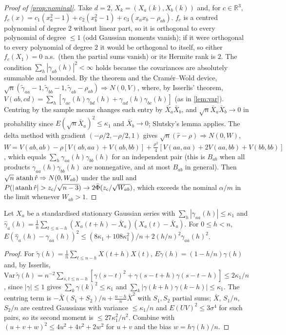 \begin{proof}[Proof of \cref{prop:nominal}]
Take $d=2$, $X_k=(X_a(k),X_b(k))$ and, for $c\in\mathbb R^3$,
$f_c(x)=c_1(x_a^2-1)+c_2(x_b^2-1)+c_3(x_ax_b-\rho_{ab})$. $f_c$ is a centred
polynomial of degree $2$ without linear part, so it is orthogonal to every
polynomial of degree $\le1$ (odd Gaussian moments vanish); if it were orthogonal
to every polynomial of degree $2$ it would be orthogonal to itself, so either
$f_c(X_1)=0$ a.s.\ (then the partial sums vanish) or its Hermite rank is $2$.
The condition $\sum_h|\gamma_{ab}(h)|^2<\infty$ holds because the covariances are
absolutely summable and bounded. By the theorem and the Cram\'er--Wold device,
$\sqrt n(\tilde\gamma_{aa}-1,\tilde\gamma_{bb}-1,\tilde\gamma_{ab}-\rho_{ab})\Rightarrow N(0,V)$,
where, by Isserlis' theorem, $V(ab,cd)=\sum_h[\gamma_{ac}(h)\gamma_{bd}(h)+\gamma_{ad}(h)\gamma_{bc}(h)]$
(as in \cref{lem:var}). Centring by the sample means changes each entry by
$\bar X_a\bar X_b$, and $\sqrt n\bar X_a\bar X_b\to0$ in probability since
$E(\sqrt n\bar X_a)^2\le\kappa_1$ and $\bar X_b\to0$; Slutsky's lemma applies.
The delta method with gradient $(-\rho/2,-\rho/2,1)$ gives $\sqrt n(\hat r-\rho)
\Rightarrow N(0,W)$,
$W=V(ab,ab)-\rho[V(ab,aa)+V(ab,bb)]+\frac{\rho^2}{4}[V(aa,aa)+2V(aa,bb)+V(bb,bb)]$,
which equals $\sum_h\gamma_{aa}(h)\gamma_{bb}(h)$ for an independent pair (this is
$B_{ab}$ when all products $\gamma_{aa}(h)\gamma_{bb}(h)$ are nonnegative, and at most
$B_{ab}$ in general). Then $\sqrt{n}\,\operatorname{atanh}\hat r\Rightarrow N(0,W_{ab})$ under the
null and $P(|\atanh\hat r|>z_c/\sqrt{n-3})\to2\bar\Phi(z_c/\sqrt{W_{ab}})$, which
exceeds the nominal $\alpha/m$ in the limit whenever $W_{ab}>1$.
\end{proof}

\begin{lemma}\label{lem:acvl2}
Let $X_a$ be a standardised stationary Gaussian series with $\sum_h|\gamma_{aa}(h)|\le\kappa_1$ and
$\hat\gamma_a(h)=\frac1n\sum_{t\le n-h}(X_a(t{+}h)-\bar X_a)(X_a(t)-\bar X_a)$. For $0\le h<n$,
$E(\hat\gamma_a(h)-\gamma_{aa}(h))^2\le(8\kappa_1+108\kappa_1^2)/n+2(h/n)^2\gamma_{aa}(h)^2$.
\end{lemma}
\begin{proof}
For $\tilde\gamma(h)=\frac1n\sum_{t\le n-h}X(t{+}h)X(t)$, $E\tilde\gamma(h)=(1-h/n)\gamma(h)$ and, by Isserlis,
$\mathrm{Var}\,\tilde\gamma(h)=n^{-2}\sum_{s,t\le n-h}[\gamma(s{-}t)^2+\gamma(s{-}t{+}h)\gamma(s{-}t{-}h)]\le2\kappa_1/n$,
since $|\gamma|\le1$ gives $\sum_k\gamma(k)^2\le\kappa_1$ and $\sum_k|\gamma(k{+}h)\gamma(k{-}h)|\le\kappa_1$. The
centring term is $-\bar X(S_1+S_2)/n+\frac{n-h}{n}\bar X^2$ with $S_1,S_2$ partial sums; $\bar X$, $S_1/n$, $S_2/n$ are
centred Gaussians with variance $\le\kappa_1/n$ and $E(UV)^2\le3\sigma^4$ for such pairs, so its second moment is
$\le27\kappa_1^2/n^2$. Combine with $(u+v+w)^2\le4u^2+4v^2+2w^2$ for $u+v$ and the bias $w=h\gamma(h)/n$.
\end{proof}

